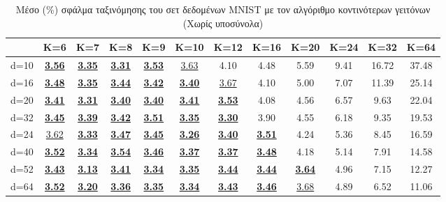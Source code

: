\begin{table}[H]
\centering
\singlespacing
\label{tab:table3}
\caption{Μέσο (\%) σφάλμα ταξινόμησης του σετ δεδομένων \textlatin{MNIST} με τον αλγόριθμο κοντινότερων γειτόνων (Χωρίς υποσύνολα)}
\vspace*{5mm}
\begin{tabular}{|c|c|c|c|c|c|c|c|c|c|c|c|}
\hline
& K=6 & K=7 & K=8 & K=9 & K=10 & K=12 & K=16 & K=20 & K=24 & K=32 & K=64 \\
\hline
d=10 & \underline{\textbf{3.56}} & \underline{\textbf{3.35}} & \underline{\textbf{3.31}} & \underline{\textbf{3.53}} & \underline{3.63} & 4.10 & 4.48 & 5.59 & 9.41 & 16.72 & 37.48 \\
d=16 & \underline{\textbf{3.48}} & \underline{\textbf{3.35}} & \underline{\textbf{3.44}} & \underline{\textbf{3.42}} & \underline{\textbf{3.40}} & \underline{3.67} & 4.10 & 5.00 & 7.07 & 11.39 & 25.14 \\
d=20 & \underline{\textbf{3.41}} & \underline{\textbf{3.31}} & \underline{\textbf{3.40}} & \underline{\textbf{3.40}} & \underline{\textbf{3.41}} & \underline{\textbf{3.53}} & 4.08 & 4.56 & 6.57 & 9.63 & 22.04 \\
d=32 & \underline{\textbf{3.45}} & \underline{\textbf{3.39}} & \underline{\textbf{3.42}} & \underline{\textbf{3.51}} & \underline{\textbf{3.35}} & \underline{\textbf{3.30}} & 3.90 & 4.55 & 6.18 & 9.35 & 19.53 \\
d=24 & \underline{3.62} & \underline{\textbf{3.33}} & \underline{\textbf{3.47}} & \underline{\textbf{3.45}} & \underline{\textbf{3.26}} & \underline{\textbf{3.40}} & \underline{\textbf{3.51}} & 4.24 & 5.36 & 8.45 & 16.59 \\
d=40 & \underline{\textbf{3.52}} & \underline{\textbf{3.34}} & \underline{\textbf{3.54}} & \underline{\textbf{3.46}} & \underline{\textbf{3.37}} & \underline{\textbf{3.37}} & \underline{\textbf{3.48}} & 4.18 & 5.14 & 7.91 & 14.58 \\
d=52 & \underline{\textbf{3.43}} & \underline{\textbf{3.13}} & \underline{\textbf{3.41}} & \underline{\textbf{3.34}} & \underline{\textbf{3.35}} & \underline{\textbf{3.44}} & \underline{\textbf{3.44}} & \underline{\textbf{3.64}} & 4.96 & 7.15 & 12.27 \\
d=64 & \underline{\textbf{3.52}} & \underline{\textbf{3.20}} & \underline{\textbf{3.36}} & \underline{\textbf{3.35}} & \underline{\textbf{3.34}} & \underline{\textbf{3.43}} & \underline{\textbf{3.46}} & \underline{3.68} & 4.89 & 6.52 & 11.06 \\

\end{tabular}
\end{table}
